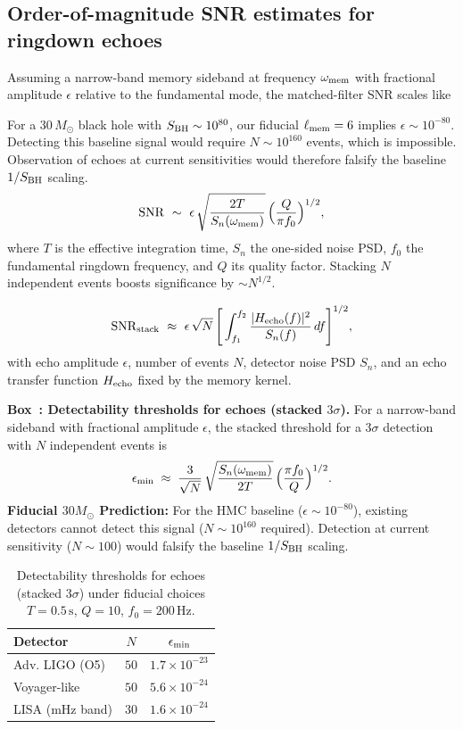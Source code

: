 \documentclass[11pt,a4paper]{article}
\newcounter{boxedresult}
\newenvironment{boxedresult}[1]{\refstepcounter{boxedresult}\begin{infobox}\noindent\textbf{Box~\theboxedresult: #1.}}{\end{infobox}}
\theoremstyle{plain}
\theoremstyle{definition}
\theoremstyle{remark}
\begin{document}
\subsection{Order-of-magnitude SNR estimates for ringdown echoes}
\label{sec:snr_estimates}
Assuming a narrow-band memory sideband at frequency $\omega_{\rm mem}$ with fractional amplitude $\epsilon$ relative to the fundamental mode,
the matched-filter SNR scales like

For a $30\,M_\odot$ black hole with $S_{\rm BH} \sim 10^{80}$, our fiducial $\ell_{\rm mem}=6$ implies $\epsilon \sim 10^{-80}$.
Detecting this baseline signal would require $N \sim 10^{160}$ events, which is impossible.
Observation of echoes at current sensitivities would therefore falsify the baseline $1/S_{\rm BH}$ scaling.
\[
{\rm SNR}\ \sim\ \epsilon\,\sqrt{\frac{2 T}{S_n(\omega_{\rm mem})}}\,\Big(\frac{Q}{\pi f_0}\Big)^{1/2},
\]
where $T$ is the effective integration time, $S_n$ the one-sided noise PSD, $f_0$ the fundamental ringdown frequency, and $Q$ its quality factor.
Stacking $N$ independent events boosts significance by $\sim N^{1/2}$.

\begin{equation}
\label{eq:snr-stack}
\mathrm{SNR}_{\rm stack}\ \approx\ \epsilon\,\sqrt{N}\,\Bigg[\int_{f_1}^{f_2}\frac{|H_{\rm echo}(f)|^2}{S_n(f)}\,df\Bigg]^{1/2},
\end{equation}
with echo amplitude \(\epsilon\), number of events \(N\), detector noise PSD \(S_n\), and an echo transfer function \(H_{\rm echo}\) fixed by the memory kernel.

\begin{boxedresult}{Detectability thresholds for echoes (stacked $3\sigma$)}
For a narrow-band sideband with fractional amplitude $\epsilon$, the stacked threshold for a $3\sigma$ detection with $N$ independent events is
\[
\epsilon_{\rm min} \;\approx\;
\frac{3}{\sqrt{N}}\,
\sqrt{\frac{S_n(\omega_{\rm mem})}{2T}}\,
\Big(\frac{\pi f_0}{Q}\Big)^{1/2}.
\]
\textbf{Fiducial $30 M_{\odot}$ Prediction:} For the HMC baseline ($\epsilon \sim 10^{-80}$), existing detectors cannot detect this signal ($N \sim 10^{160}$ required). 
Detection at current sensitivity ($N \sim 100$) would falsify the baseline $1/S_{\rm BH}$ scaling.
\end{boxedresult}

\begin{table}[!htbp]
\centering
\caption{Detectability thresholds for echoes (stacked $3\sigma$) under fiducial choices $T=0.5\,\mathrm{s}$, $Q=10$, $f_0=200\,\mathrm{Hz}$.}
\label{tab:echo_thresholds}
\small
\begin{tabular}{lcc}
\toprule
Detector & $N$ & $\epsilon_{\rm min}$ \\
\midrule
Adv. LIGO (O5) & $50$ & $1.7\times 10^{-23}$ \\
Voyager-like & $50$ & $5.6\times 10^{-24}$ \\
LISA (mHz band) & $30$ & $1.6\times 10^{-24}$ \\
\bottomrule
\end{tabular}
\end{table}
\end{document}
